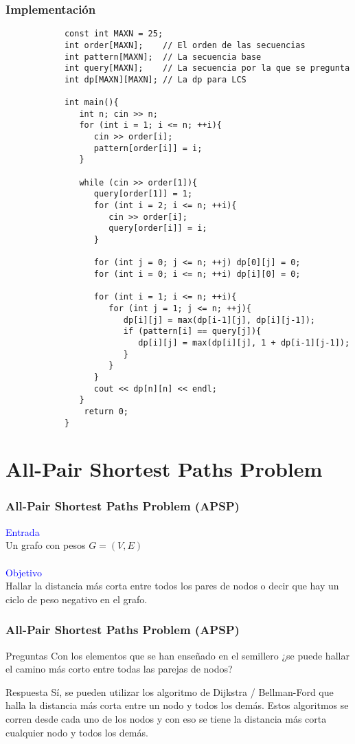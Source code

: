 \documentclass{beamer}
\begin{document}
	\begin{frame}
		\frametitle{Implementación}
		\begin{lstlisting}
			const int MAXN = 25;
			int order[MAXN];    // El orden de las secuencias
			int pattern[MAXN];  // La secuencia base
			int query[MAXN];    // La secuencia por la que se pregunta
			int dp[MAXN][MAXN]; // La dp para LCS

			int main(){
			   int n; cin >> n;
			   for (int i = 1; i <= n; ++i){
			      cin >> order[i];
			      pattern[order[i]] = i;
			   }

			   while (cin >> order[1]){
			      query[order[1]] = 1;
			      for (int i = 2; i <= n; ++i){
			         cin >> order[i];
			         query[order[i]] = i;
			      }
			
			      for (int j = 0; j <= n; ++j) dp[0][j] = 0;
			      for (int i = 0; i <= n; ++i) dp[i][0] = 0;

			      for (int i = 1; i <= n; ++i){
			         for (int j = 1; j <= n; ++j){
			            dp[i][j] = max(dp[i-1][j], dp[i][j-1]);
			            if (pattern[i] == query[j]){
			               dp[i][j] = max(dp[i][j], 1 + dp[i-1][j-1]);
			            }
			         }
			      }
			      cout << dp[n][n] << endl;
			   }
			    return 0;
			}
		\end{lstlisting}
	\end{frame}

\section[APSP Problem]{All-Pair Shortest Paths Problem}
	\begin{frame}
		\frametitle{All-Pair Shortest Paths Problem (APSP)}
		\textcolor{blue}{\large Entrada}\\
		Un grafo con pesos $G = (V, E)$ \\ \quad \\
		\textcolor{blue}{\large Objetivo}\\
		Hallar la distancia más corta entre todos los pares de nodos o decir que hay un ciclo de peso negativo en el grafo.
	\end{frame}
	
	\begin{frame}
		\frametitle{All-Pair Shortest Paths Problem (APSP)}
		\begin{alertblock}{Preguntas}
			Con los elementos que se han enseñado en el semillero ¿se puede hallar el camino más corto entre todas las parejas de nodos?
		\end{alertblock}
		\pause
		\begin{exampleblock}{Respuesta}
			Sí, se pueden utilizar los algoritmo de Dijkstra / Bellman-Ford que halla la distancia más corta entre un nodo y todos los demás. Estos algoritmos se corren desde cada uno de los nodos y con eso se tiene la distancia más corta cualquier nodo y todos los demás.
		\end{exampleblock}
	\end{frame}
\end{document}
